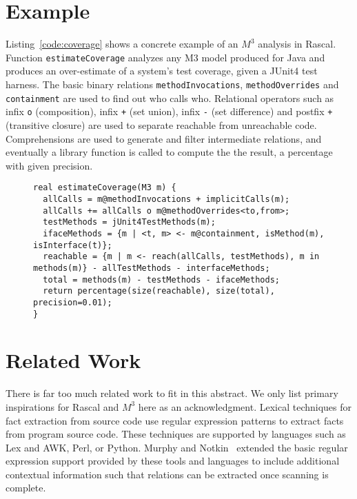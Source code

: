\documentclass[conference]{IEEEtran}
\newcommand{\mthree}{\ensuremath{M^3}\xspace}
\begin{document}
\section{Example}

Listing~\ref{code:coverage} shows a concrete example of an \mthree analysis in
Rascal. Function \lstinline{estimateCoverage} analyzes any M3
model produced for Java and produces an over-estimate of a
system's test coverage, given a JUnit4 test harness. The basic
binary relations \lstinline{methodInvocations}, \lstinline{methodOverrides}
and \lstinline{containment} are used to find out who calls who. Relational
operators such as infix \lstinline{o} (composition), infix \lstinline{+} (set
union), infix \lstinline{-} (set difference) and postfix \lstinline{+}
(transitive closure) are used to separate reachable from unreachable code.
Comprehensions are used to generate and filter intermediate relations, and
eventually a library function is called to compute the the result, a percentage with given
precision.


\begin{figure}[t]

\begin{lstlisting}[caption=Statically estimating test coverage using \mthree., label=code:coverage,language=rascal]
real estimateCoverage(M3 m) {
  allCalls = m@methodInvocations + implicitCalls(m);
  allCalls += allCalls o m@methodOverrides<to,from>;
  testMethods = jUnit4TestMethods(m);
  ifaceMethods = {m | <t, m> <- m@containment, isMethod(m), isInterface(t)};  
  reachable = {m | m <- reach(allCalls, testMethods), m in methods(m)} - allTestMethods - interfaceMethods;
  total = methods(m) - testMethods - ifaceMethods;
  return percentage(size(reachable), size(total), precision=0.01);
}
\end{lstlisting}
\end{figure}

\section{Related Work}

There is far too much related work to fit in this abstract. We only list primary inspirations for Rascal and \mthree here as an acknowledgment.
%
Lexical techniques for fact extraction from source code use regular expression patterns to extract facts from
program source code. These techniques are supported by languages such as Lex and AWK, Perl, or Python. Murphy and
Notkin~\cite{MurphyNotkin95,DBLP:journals/tosem/MurphyN96} extended the
basic regular expression support provided by these tools and languages
to include additional contextual information such that relations can be extracted once scanning is complete.
\end{document}
